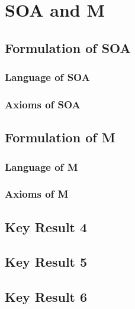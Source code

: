 \documentclass{article}
\begin{document}
\section{SOA and M}
\subsection{Formulation of SOA}
\subsubsection{Language of SOA}
\subsubsection{Axioms of SOA}
\subsection{Formulation of M}
\subsubsection{Language of M}
\subsubsection{Axioms of M}
\subsection{Key Result 4}
\subsection{Key Result 5}
\subsection{Key Result 6}
\end{document}
